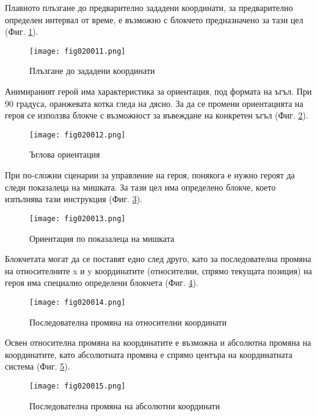 Плавното плъзгане до предварително зададени координати, за предварително определен интервал от време, е възможно с блокчето предназначено за тази цел (Фиг. \ref{fig020011}).

\begin{figure}[H]
  \centering
  \texttt{[image: fig020011.png]}
  \caption{Плъзгане до зададени координати}
\label{fig020011}
\end{figure}

Анимираният герой има характеристика за ориентация, под формата на ъгъл. При 90 градуса, оранжевата котка гледа на дясно. За да се промени ориентацията на героя се използва блокче с възможност за въвеждане на конкретен ъгъл (Фиг. \ref{fig020012}).

\begin{figure}[H]
  \centering
  \texttt{[image: fig020012.png]}
  \caption{Ъглова ориентация}
\label{fig020012}
\end{figure}

При по-сложни сценарии за управление на героя, понякога е нужно героят да следи показалеца на мишката. За тази цел има определено блокче, което изпълнява тази инструкция (Фиг. \ref{fig020013}).

\begin{figure}[H]
  \centering
  \texttt{[image: fig020013.png]}
  \caption{Ориентация по показалеца на мишката}
\label{fig020013}
\end{figure}

Блокчетата могат да се поставят едно след друго, като за последователна промяна на относителните x и y координатите (относителни, спрямо текущата позиция) на героя има специално определени блокчета (Фиг. \ref{fig020014}).

\begin{figure}[H]
  \centering
  \texttt{[image: fig020014.png]}
  \caption{Последователна промяна на относителни координати}
\label{fig020014}
\end{figure}

Освен относителна промяна на координатите е възможна и абсолютна промяна на координатите, като абсолютната промяна е спрямо центъра на координатната система (Фиг. \ref{fig020015}).

\begin{figure}[H]
  \centering
  \texttt{[image: fig020015.png]}
  \caption{Последователна промяна на абсолютни координати}
\label{fig020015}
\end{figure}

